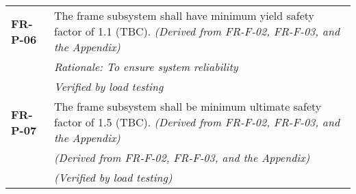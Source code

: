 \begin{longtable}{P{2cm}P{13.25cm}}
\textbf{FR-P-06}	&
The frame subsystem shall have minimum yield safety factor of 1.1 (\gls{TBC}).
\textit{(Derived from FR-F-02, FR-F-03, and the Appendix)}	\\
& \textit{Rationale: To ensure system reliability} \\
& \textit{Verified by load testing}	\\

\textbf{FR-P-07}	&
The frame subsystem shall be minimum ultimate safety factor of 1.5 (\gls{TBC}).
\textit{(Derived from FR-F-02, FR-F-03, and the Appendix)}	\\
& \textit{(Derived from FR-F-02, FR-F-03, and the Appendix)}	\\
& \textit{(Verified by load testing)}		
\end{longtable}